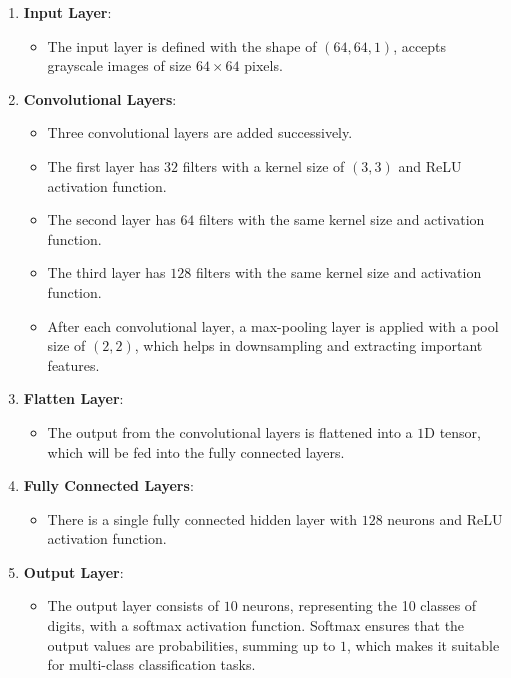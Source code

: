 \begin{enumerate}
    \item \textbf{Input Layer}:
        \begin{itemize}
            \item The input layer is defined with the shape of $(64, 64, 1)$, accepts grayscale images of size $64 \times 64$ pixels.
        \end{itemize}
    
    \item \textbf{Convolutional Layers}:
        \begin{itemize}
            \item Three convolutional layers are added successively.
            \item The first layer has $32$ filters with a kernel size of $(3, 3)$ and ReLU activation function.
            \item The second layer has $64$ filters with the same kernel size and activation function.
            \item The third layer has $128$ filters with the same kernel size and activation function.
            \item After each convolutional layer, a max-pooling layer is applied with a pool size of $(2, 2)$, which helps in downsampling and extracting important features.
        \end{itemize}
    
    \item \textbf{Flatten Layer}:
        \begin{itemize}
            \item The output from the convolutional layers is flattened into a $1$D tensor, which will be fed into the fully connected layers.
        \end{itemize}
    
    \item \textbf{Fully Connected Layers}:
        \begin{itemize}
            \item There is a single fully connected hidden layer with $128$ neurons and ReLU activation function.
        \end{itemize}
    
    \item \textbf{Output Layer}:
        \begin{itemize}
            \item The output layer consists of $10$ neurons, representing the 10 classes of digits, with a softmax activation function. Softmax ensures that the output values are probabilities, summing up to $1$, which makes it suitable for multi-class classification tasks.
        \end{itemize}
    

\end{enumerate}
